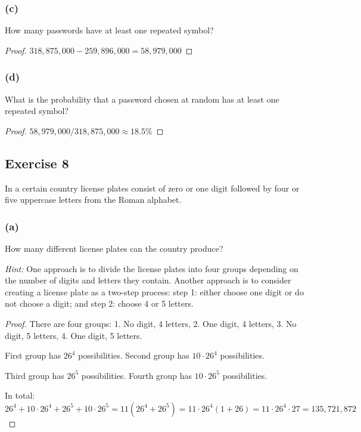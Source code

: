 \documentclass[14pt]{extarticle}
\begin{document}
\subsubsection{(c)}
How many passwords have at least one repeated symbol?

\begin{proof}
     \(318,875,000 - 259,896,000 = 58,979,000\)
\end{proof}

\subsubsection{(d)}
What is the probability that a password chosen at random has at least one repeated symbol?

\begin{proof}
     \(58,979,000 / 318,875,000 \approx 18.5\% \)
\end{proof}

\subsection{Exercise 8}
In a certain country license plates consist of zero or one digit followed by four or five uppercase letters from the
Roman alphabet.

\subsubsection{(a)}
How many different license plates can the country produce?

{\it Hint:} One approach is to divide the license plates into four groups depending on the number of digits and
letters they contain. Another approach is to consider creating a license plate as a two-step process: step 1:
either choose one digit or do not choose a digit; and step 2: choose 4 or 5 letters.

\begin{proof}
     There are four groups: 1. No digit, 4 letters, 2. One digit, 4 letters, 3. No digit, 5 letters, 4. One digit, 5
     letters.

     First group has \(26^4\) possibilities. Second group has \(10 \cdot 26^4\) possibilities.

     Third group has \(26^5\) possibilities. Fourth group has \(10 \cdot 26^5\) possibilities.

     In total: \(26^4 + 10 \cdot 26^4 + 26^5 + 10 \cdot 26^5 = 11(26^4 + 26^5) = 11 \cdot 26^4 (1 + 26) = 11 \cdot 26^4
     \cdot 27 = 135,721,872\)
\end{proof}
\end{document}
